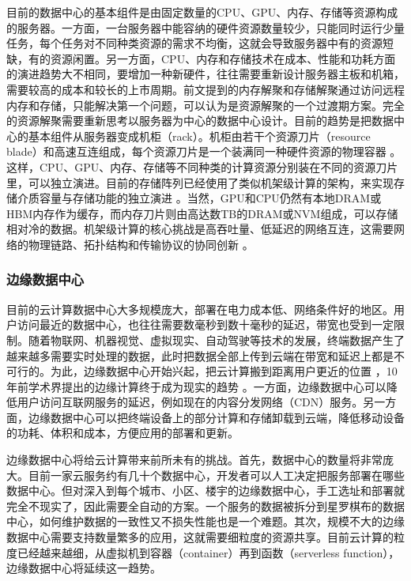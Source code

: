 目前的数据中心的基本组件是由固定数量的CPU、GPU、内存、存储等资源构成的服务器。一方面，一台服务器中能容纳的硬件资源数量较少，只能同时运行少量任务，每个任务对不同种类资源的需求不均衡，这就会导致服务器中有的资源短缺，有的资源闲置。另一方面，CPU、内存和存储技术在成本、性能和功耗方面的演进趋势大不相同，要增加一种新硬件，往往需要重新设计服务器主板和机箱，需要较高的成本和较长的上市周期。前文提到的内存解聚和存储解聚通过访问远程内存和存储，只能解决第一个问题，可以认为是资源解聚的一个过渡期方案。完全的资源解聚需要重新思考以服务器为中心的数据中心设计。目前的趋势是把数据中心的基本组件从服务器变成机柜（rack）。机柜由若干个资源刀片（resource blade）和高速互连组成，每个资源刀片是一个装满同一种硬件资源的物理容器 \cite{camcubeos}。这样，CPU、GPU、内存、存储等不同种类的计算资源分别装在不同的资源刀片里，可以独立演进。目前的存储阵列已经使用了类似机架级计算的架构，来实现存储介质容量与存储功能的独立演进 \cite{pelican}。当然，GPU和CPU仍然有本地DRAM或HBM内存作为缓存，而内存刀片则由高达数TB的DRAM或NVM组成，可以存储相对冷的数据。机架级计算的核心挑战是高吞吐量、低延迟的网络互连，这需要网络的物理链路、拓扑结构和传输协议的协同创新 \cite{r2c2}。

\subsubsection{边缘数据中心}

目前的云计算数据中心大多规模庞大，部署在电力成本低、网络条件好的地区。用户访问最近的数据中心，也往往需要数毫秒到数十毫秒的延迟，带宽也受到一定限制。随着物联网、机器视觉、虚拟现实、自动驾驶等技术的发展，终端数据产生了越来越多需要实时处理的数据，此时把数据全部上传到云端在带宽和延迟上都是不可行的。为此，边缘数据中心开始兴起，把云计算搬到距离用户更近的位置 \cite{edge-data-center}，10 年前学术界提出的边缘计算终于成为现实的趋势 \cite{satyanarayanan2009case}。一方面，边缘数据中心可以降低用户访问互联网服务的延迟，例如现在的内容分发网络（CDN）服务。另一方面，边缘数据中心可以把终端设备上的部分计算和存储卸载到云端，降低移动设备的功耗、体积和成本，方便应用的部署和更新。

边缘数据中心将给云计算带来前所未有的挑战。首先，数据中心的数量将非常庞大。目前一家云服务约有几十个数据中心，开发者可以人工决定把服务部署在哪些数据中心。但对深入到每个城市、小区、楼宇的边缘数据中心，手工选址和部署就完全不现实了，因此需要全自动的方案。一个服务的数据被拆分到星罗棋布的数据中心，如何维护数据的一致性又不损失性能也是一个难题。其次，规模不大的边缘数据中心需要支持数量繁多的应用，这就需要细粒度的资源共享。目前云计算的粒度已经越来越细，从虚拟机到容器（container）再到函数（serverless function），边缘数据中心将延续这一趋势。


